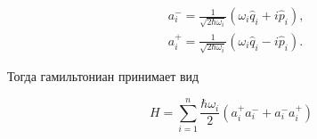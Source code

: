 \documentclass[10pt]{article}
\begin{document}
\[

\begin{aligned}

& a_{i}^{-}=\frac{1}{\sqrt{2 \hbar \omega_{i}}}\left(\omega_{i} \hat{q}_{i}+i \hat{p}_{i}\right), \\

& a_{i}^{+}=\frac{1}{\sqrt{2 \hbar \omega_{i}}}\left(\omega_{i} \hat{q}_{i}-i \hat{p}_{i}\right) .

\end{aligned}

\]



Тогда гамильтониан принимает вид



\[

H=\sum_{i=1}^{n} \frac{\hbar \omega_{i}}{2}\left(a_{i}^{+} a_{i}^{-}+a_{i}^{-} a_{i}^{+}\right)

\]
\end{document}
